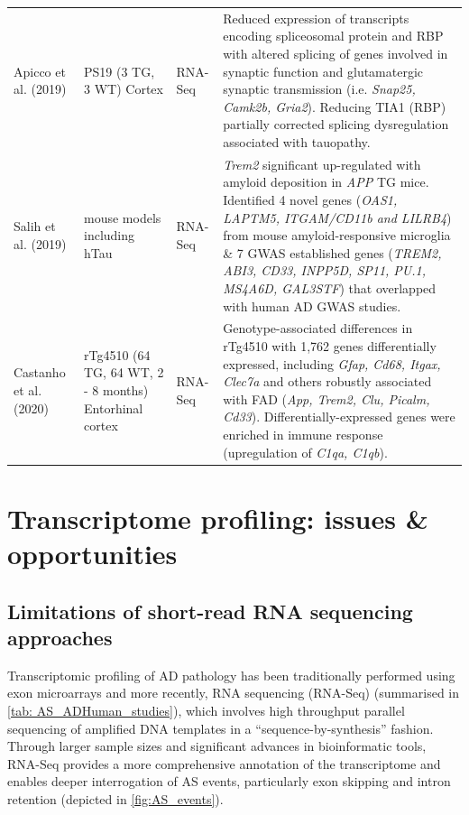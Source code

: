 \begin{landscape}
\begin{longtable}[c]{p{3cm}p{4cm}p{3cm}p{16cm}}
		\centering Apicco et al. (2019) \cite{Apicco2019} &
		\centering PS19 (3 TG, 3 WT) \newline Cortex &
		\centering RNA-Seq &
		\tabitem Reduced expression of transcripts encoding spliceosomal protein and RBP with altered splicing of genes involved in synaptic function and glutamatergic synaptic transmission (i.e. \textit{Snap25, Camk2b, Gria2}). \newline
		\tabitem Reducing TIA1 (RBP) partially corrected splicing dysregulation associated with tauopathy. \\
		\hdashline[0.5pt/5pt]
		
		\centering Salih et al. (2019) \cite{Salih2019} &
		\centering 5 mouse models including hTau   &
		\centering RNA-Seq &
		\tabitem \textit{Trem2} significant up-regulated with amyloid deposition in \textit{APP} TG mice. \newline
		\tabitem Identified 4 novel genes (\textit{OAS1, LAPTM5, ITGAM/CD11b and LILRB4}) from mouse amyloid-responsive microglia \& 7 GWAS established genes (\textit{TREM2, ABI3, CD33, INPP5D, SP11, PU.1, MS4A6D, GAL3STF}) that overlapped with human AD GWAS studies. \\
		\hdashline[0.5pt/5pt]
		
		\centering Castanho et al. (2020) \cite{Castanho2020} &
		\centering rTg4510 (64 TG, 64 WT, 2 - 8 months) \newline Entorhinal cortex &
		\centering RNA-Seq &
		\tabitem Genotype-associated differences in rTg4510 with 1,762 genes differentially expressed, including \textit{Gfap, Cd68, Itgax, Clec7a} and others robustly associated with FAD (\textit{App, Trem2, Clu, Picalm, Cd33}).  \newline
		\tabitem Differentially-expressed genes were enriched in immune response (upregulation of \textit{C1qa, C1qb}).\\* \bottomrule
	\end{longtable}
\end{landscape}
\restoregeometry


\section{Transcriptome profiling: issues \& opportunities}
\subsection{Limitations of short-read RNA sequencing approaches}
\label{rnaseq_intro}
Transcriptomic profiling of AD pathology has been traditionally performed using exon microarrays and more recently, RNA sequencing (RNA-Seq) (summarised in \cref{tab: AS_ADHuman_studies}), which involves high throughput parallel sequencing of amplified DNA templates in a “sequence-by-synthesis” fashion. Through larger sample sizes and significant advances in bioinformatic tools, RNA-Seq provides a more comprehensive annotation of the transcriptome and enables deeper interrogation of AS events, particularly exon skipping and intron retention (depicted in \cref{fig:AS_events}). 


